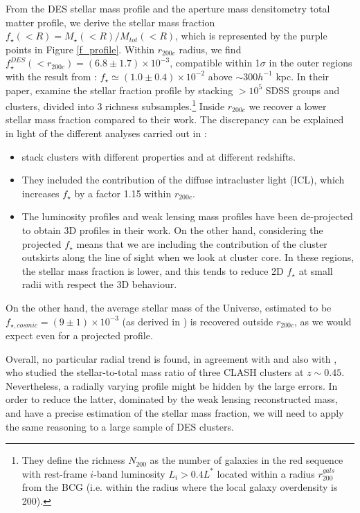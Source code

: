 {From the DES stellar mass profile and the aperture mass densitometry total matter profile, we derive the stellar mass fraction $f_\star (<R)=M_\star(<R)/M_{tot}(<R)$, which is represented by the purple points in Figure \ref{f_profile}. Within $r_{200c}$ radius, we find $f^{DES}_\star (<r_{200c})=(6.8\pm 1.7)\times10^{-3}$, compatible within 1$\sigma$ in the outer regions with the result from \citet{bahcall}: $f_\star \simeq (1.0 \pm 0.4)\times10^{-2}$ above $\sim 300 h^{-1}$ kpc. In their paper, \citet{bahcall} examine the stellar fraction profile by stacking $> 10^5$ SDSS groups and clusters, divided into 3 richness subsamples.\footnote{They define the richness $N_{200}$ as the number of galaxies in the red sequence with rest-frame $i$-band luminosity $L_i>0.4L^*$ located within a radius $r^{gals}_{200}$ from the BCG (i.e. within the radius where the local galaxy overdensity is 200).} Inside $r_{200c}$ we recover a lower stellar mass fraction compared to their work. The discrepancy can be explained in light of the different analyses carried out in \citet{bahcall}:
\begin{itemize}
\item \citet{bahcall} stack clusters with different properties and at different redshifts.
\item They included the contribution of the diffuse intracluster light (ICL), which increases $f_\star$ by a factor 1.15 within $r_{200c}$.
\item The luminosity profiles and weak lensing mass profiles have been de-projected to obtain 3D profiles in their work. On the other hand, considering the projected $f_\star$ means that we are including the contribution of the cluster outskirts along the line of sight when we look at cluster core. In these regions, the stellar mass fraction is lower, and this tends to reduce 2D $f_\star$ at small radii with respect the 3D behaviour.
\end{itemize}

 On the other hand, the average stellar mass of the Universe, estimated to be $f_{\star,cosmic}=(9\pm1)\times 10^{-3}$ (as derived in \citealt{bahcall}) is recovered outside $r_{200c}$, as we would expect even for a projected profile.
 
Overall, no particular radial trend is found, in agreement with \citet{bahcall} and also with \citet{andreon}, who studied the stellar-to-total mass ratio of three CLASH clusters at $z\sim 0.45$. Nevertheless, a radially varying profile might be hidden by the large errors. In order to reduce the latter, dominated by the weak lensing reconstructed mass, and have a precise estimation of the stellar mass fraction, we will need to apply the same reasoning to a large sample of DES clusters.

}
